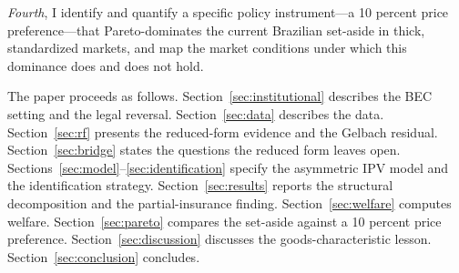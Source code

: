 \emph{Fourth}, I identify and quantify a specific policy instrument---a 10 percent price preference---that Pareto-dominates the current Brazilian set-aside in thick, standardized markets, and map the market conditions under which this dominance does and does not hold.

The paper proceeds as follows. Section~\ref{sec:institutional} describes the BEC setting and the legal reversal. Section~\ref{sec:data} describes the data. Section~\ref{sec:rf} presents the reduced-form evidence and the Gelbach residual. Section~\ref{sec:bridge} states the questions the reduced form leaves open. Sections~\ref{sec:model}--\ref{sec:identification} specify the asymmetric IPV model and the identification strategy. Section~\ref{sec:results} reports the structural decomposition and the partial-insurance finding. Section~\ref{sec:welfare} computes welfare. Section~\ref{sec:pareto} compares the set-aside against a 10 percent price preference. Section~\ref{sec:discussion} discusses the goods-characteristic lesson. Section~\ref{sec:conclusion} concludes.
